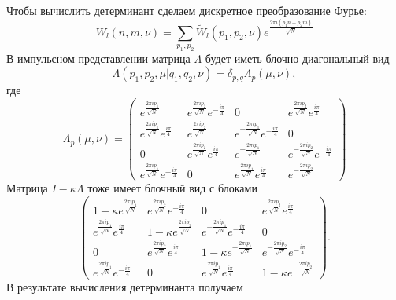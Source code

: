 \documentclass[a4paper,12pt]{article}
\theoremstyle{definition}
\theoremstyle{definition}
\theoremstyle{definition}
\begin{document}
Чтобы вычислить детерминант сделаем дискретное преобразование Фурье:
\begin{equation}
  \label{eq:128}
  W_{l}(n,m,\nu)=\sum_{p_1,p_2} \tilde{W}_l(p_1,p_2,\nu) e^{\frac{2\pi i (p_1n+p_2m)}{\sqrt N}}
\end{equation}
В импульсном представлении матрица $\Lambda$ будет иметь блочно-диагональный вид
\begin{equation}
  \label{eq:129}
  \Lambda(p_1,p_2,\mu|q_1,q_2,\nu)=\delta_{p,q}\Lambda_p (\mu,\nu),
\end{equation}
где
\begin{equation}
  \label{eq:130}
  \Lambda_p(\mu,\nu)=
  \begin{pmatrix}
    e^{\frac{2\pi i p_1}{\sqrt N}} & e^{\frac{2\pi i p_2}{\sqrt N}} e^{-\frac{i\pi}{4}} & 0 & e^{\frac{2\pi i p_2}{\sqrt N}} e^{\frac{i\pi}{4}} \\
    e^{\frac{2\pi i p_1}{\sqrt N}} e^{\frac{i\pi}{4}} & e^{\frac{2\pi i p_2}{\sqrt N}} & e^{-\frac{2\pi i p_1}{\sqrt N}} e^{-\frac{i\pi}{4}} & 0 \\
    0 & e^{\frac{2\pi i p_2}{\sqrt N}} e^{\frac{i\pi}{4}} & e^{-\frac{2\pi i p_1}{\sqrt N}} & e^{-\frac{2\pi i p_2}{\sqrt N}} e^{-\frac{i\pi}{4}} \\
    e^{\frac{2\pi i p_1}{\sqrt N}} e^{-\frac{i\pi}{4}} & 0 & e^{\frac{2\pi i p_1}{\sqrt N}} e^{\frac{i\pi}{4}} & e^{-\frac{2\pi i p_2}{\sqrt N}}
  \end{pmatrix}
\end{equation}
Матрица $I-\kappa\Lambda$ тоже имеет блочный вид с блоками
\begin{equation}
  \label{eq:131}
  \begin{pmatrix}
    1-\kappa e^{\frac{2\pi i p_1}{\sqrt N}} & e^{\frac{2\pi i p_2}{\sqrt N}} e^{-\frac{i\pi}{4}} & 0 & e^{\frac{2\pi i p_2}{\sqrt N}} e^{\frac{i\pi}{4}} \\
    e^{\frac{2\pi i p_1}{\sqrt N}} e^{\frac{i\pi}{4}} & 1-\kappa e^{\frac{2\pi i p_2}{\sqrt N}} & e^{-\frac{2\pi i p_1}{\sqrt N}} e^{-\frac{i\pi}{4}} & 0 \\
    0 & e^{\frac{2\pi i p_2}{\sqrt N}} e^{\frac{i\pi}{4}} & 1-\kappa e^{-\frac{2\pi i p_1}{\sqrt N}} & e^{-\frac{2\pi i p_2}{\sqrt N}} e^{-\frac{i\pi}{4}} \\
    e^{\frac{2\pi i p_1}{\sqrt N}} e^{-\frac{i\pi}{4}} & 0 & e^{\frac{2\pi i p_1}{\sqrt N}} e^{\frac{i\pi}{4}} & 1- \kappa e^{-\frac{2\pi i p_2}{\sqrt N}}
  \end{pmatrix}.
\end{equation}
В результате вычисления детерминанта получаем
\end{document}
